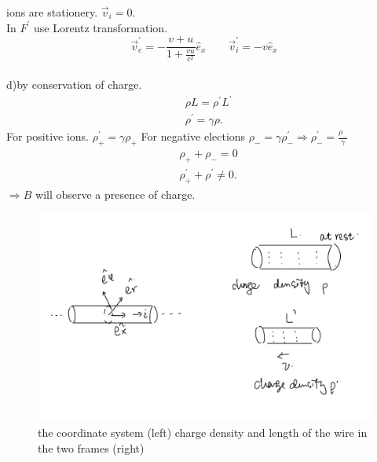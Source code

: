 \documentclass{article}
\begin{document}
ions are stationery. $\vec{v}_i=0$.\\
In $F^{\prime}$ use Lorentz transformation.
$$
\vec{v}_e^{\prime}=-\frac{v+u}{1+\frac{v u}{c^2}} \hat{e}_x \quad \quad \vec{v}_i^{\prime}=-v \hat{e}_x
$$\\
d)by conservation of charge.\\
$$
\begin{aligned}
& \rho L=\rho^{\prime} L^{\prime} \\
& \rho^{\prime}=\gamma \rho .
\end{aligned}
$$
For positive ions. $\rho_{+}^{\prime}=\gamma \rho_{+}$
For negative elections $\rho_{-}=\gamma \rho_{-}^{\prime} \Rightarrow \rho_{-}^{\prime}=\frac{\rho_{-}}{\gamma}$
$$
\begin{aligned}
& \rho_{+}+\rho_{-}=0 \\
& \rho_{+}^{\prime}+\rho^{\prime} \neq 0 .
\end{aligned}
$$
$\Rightarrow B$ will observe a presence of charge.
\begin{figure}
	\centering
	\includegraphics[width=0.7\linewidth]{spho_book_TYS_images/2012_sol_Q6.jpg}
	\caption{the coordinate system (left) charge density and length of the wire in the two frames (right)}
\end{figure}
\end{document}
